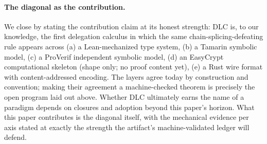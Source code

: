 \paragraph{The diagonal as the contribution.}  We close by stating
the contribution claim at its honest strength: DLC is, to our
knowledge, the first delegation calculus in which the same
chain-splicing-defeating rule appears across (a) a Lean-mechanized
type system, (b) a Tamarin symbolic model, (c) a ProVerif independent
symbolic model, (d) an EasyCrypt computational skeleton (shape only;
no proof content yet), (e) a Rust wire format with content-addressed
encoding.  The layers agree today by construction and convention;
making their agreement a machine-checked theorem is precisely the
open program laid out above.  Whether DLC ultimately earns the name
of a paradigm depends on closures and adoption beyond this paper's
horizon.  What this paper contributes is the diagonal itself, with
the mechanical evidence per axis stated at exactly the strength the
artifact's machine-validated ledger will defend.
